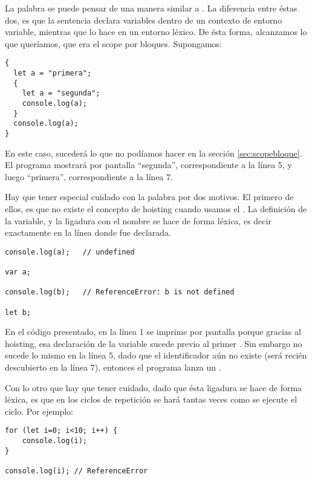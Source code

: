 \subsubsection{}

La palabra  se puede pensar de una manera similar a . La diferencia entre éstas dos, es que la sentencia  declara variables dentro de un contexto de entorno variable, mientras que  lo hace en un entorno léxico. De ésta forma, alcanzamos lo que queríamos, que era el scope por bloques. Supongamos:

\begin{lstlisting}
{
  let a = "primera";
  {
    let a = "segunda";
    console.log(a);
  }
  console.log(a);
}
\end{lstlisting}

En este caso, sucederá lo que no podíamos hacer en la sección \ref{sec:scopebloque}. El programa mostrará por pantalla "`segunda"', correspondiente a la línea 5, y luego "`primera"', correspondiente a la línea 7.

Hay que tener especial cuidado con la palabra  por dos motivos. El primero de ellos, es que no existe el concepto de hoisting cuando usamos el . La definición de la variable, y la ligadura con el nombre se hace de forma léxica, es decir exactamente en la línea donde fue declarada.

\begin{lstlisting}[title={Hoisting en \code{var} pero no en \code{let}}]
console.log(a);   // undefined

var a;

console.log(b);   // ReferenceError: b is not defined

let b;
\end{lstlisting}

En el código presentado, en la línea 1 se imprime por pantalla  porque gracias al hoisting, esa declaración de la variable  sucede previo al primer . Sin embargo no sucede lo mismo en la línea 5, dado que el identificador  aún no existe (será recién descubierto en la línea 7), entonces el programa lanza un .

Con lo otro que hay que tener cuidado, dado que ésta ligadura se hace de forma léxica, es que en los ciclos de repetición se hará tantas veces como se ejecute el ciclo. Por ejemplo:

\begin{lstlisting}
for (let i=0; i<10; i++) {
	console.log(i);
}

console.log(i); // ReferenceError
\end{lstlisting}

